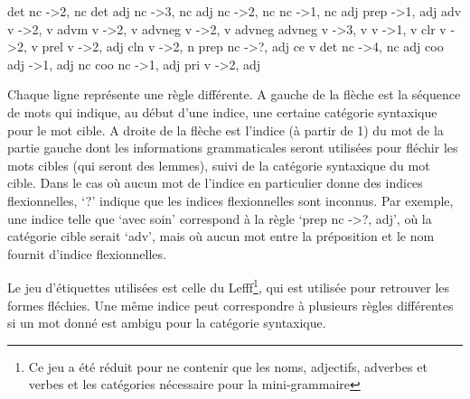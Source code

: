 \begin{framed}
det nc -\textgreater 2, nc\newline
det adj nc -\textgreater 3, nc\newline
adj nc -\textgreater 2, nc\newline
nc -\textgreater 1, nc\newline
adj prep -\textgreater 1, adj\newline
adv v -\textgreater 2, v\newline
advm v -\textgreater 2, v\newline
advneg v -\textgreater 2, v\newline
advneg advneg v -\textgreater 3, v\newline
v -\textgreater 1, v\newline
clr v -\textgreater 2, v\newline
prel v -\textgreater 2, adj \newline
cln v -\textgreater 2, n\newline
prep nc -\textgreater ?, adj\newline
ce v det nc -\textgreater 4, nc\newline
adj coo adj -\textgreater 1, adj\newline
nc coo nc -\textgreater 1, adj\newline
pri v -\textgreater 2, adj
\end{framed}

Chaque ligne représente une règle différente. A gauche de la flèche est la séquence de mots qui indique, au début d'une indice, une certaine catégorie syntaxique pour le mot cible. A droite de la flèche est l'indice (à partir de 1) du mot de la partie gauche dont les informations grammaticales seront utilisées pour fléchir les mots cibles (qui seront des lemmes), suivi de la catégorie syntaxique du mot cible. Dans le cas où aucun mot de l'indice en particulier donne des indices flexionnelles, \lq{?}\rq{} indique que les indices flexionnelles sont inconnus. Par exemple, une indice telle que \lq{avec soin}\rq{} correspond à la règle \lq{prep nc -\textgreater ?, adj}\rq{}, où la catégorie cible serait \lq{adv}\rq{}, mais où aucun mot entre la préposition et le nom fournit d'indice flexionnelles.

Le jeu d'étiquettes utilisées est celle du Lefff\footnote{Ce jeu a été réduit pour ne contenir que les noms, adjectifs, adverbes et verbes et les catégories nécessaire pour la mini-grammaire}, qui est utilisée pour retrouver les formes fléchies. Une même indice peut correspondre à plusieurs règles différentes si un mot donné est ambigu pour la catégorie syntaxique.

